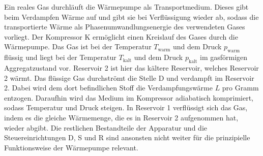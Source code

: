 Ein reales Gas durchläuft die Wärmepumpe als Transportmedium. Dieses gibt beim Verdampfen
Wärme auf und gibt sie bei Verflüssigung wieder ab, sodass die transportierte Wärme
als Phasenumwandlungsenergie des verwendeten Gases vorliegt. Der Kompressor K ermöglicht
einen Kreislauf des Gases durch die Wärmepumpe. Das Gas ist bei der Temperatur $T_\text{warm}$
und dem Druck $p_\text{warm}$ flüssig und liegt bei der Temperatur $T_\text{kalt}$ und dem
Druck $p_\text{kalt}$ im gasförmigen Aggregatzustand vor. Reservoir 2 ist hier das
kältere Reservoir, welches Reservoir 2 wärmt. Das flüssige Gas durchströmt die Stelle D
und verdampft im Reservoir 2. Dabei wird dem dort befindlichen Stoff die Verdampfungswärme
$L$ pro Gramm entzogen. Daraufhin wird das Medium im Kompressor adiabatisch komprimiert,
sodass Temperatur und Druck steigen. In Reservoir 1 verflüssigt sich das Gas, indem es
die gleiche Wärmemenge, die es in Reservoir 2 aufgenommen hat, wieder abgibt.
Die restlichen Bestandteile der Apparatur und die Steuereinrichtungen D, S und R sind
ansonsten nicht weiter für die prinzipielle Funktionsweise der Wärmepumpe relevant.

